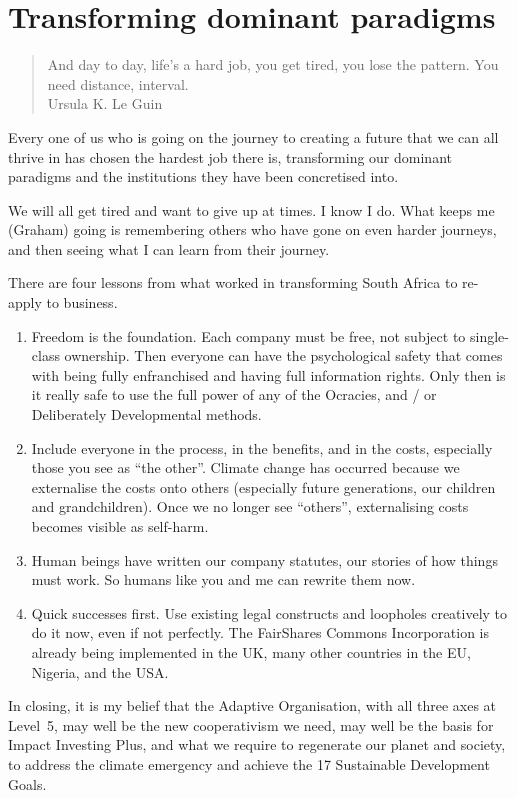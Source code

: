 \section{Transforming dominant paradigms}
\begin{quote}
And day to day, life's a hard job, you get tired, you lose the pattern. You need distance, interval.\\
\raggedleft\textemdash Ursula K. Le Guin
\end{quote}


Every one of us who is going on the journey to creating a future that we can all thrive in has chosen the hardest job there is, transforming our dominant paradigms and the institutions they have been concretised into. 


We will all get tired and want to give up at times. I know I do. What keeps me (Graham) going is remembering others who have gone on even harder journeys, and then seeing what I can learn from their journey. 


There are four lessons from what worked in transforming South Africa to re-apply to business.


\begin{enumerate}
\item Freedom is the foundation. Each company must be free, not subject to single-class ownership. Then everyone can have the psychological safety that comes with being fully enfranchised and having full information rights. Only then is it really safe to use the full power of any of the Ocracies\cite{robertson-holacracy, rau-sociocracy}, and / or Deliberately Developmental\cite{kegan-everyone} methods.
\item Include everyone in the process, in the benefits, and in the costs, especially those you see as “the other”. Climate change  has occurred because we externalise the costs onto others (especially future generations, our children and grandchildren). Once we no longer see “others”, externalising costs becomes visible as self-harm.
\item Human beings have written our company statutes, our stories of how things must work. So humans like you and me can rewrite them now.
\item Quick successes first. Use existing legal constructs and loopholes creatively to do it now, even if not perfectly. The FairShares Commons Incorporation is already being implemented in the UK, many other countries in the EU, Nigeria, and the USA.
\end{enumerate}




In closing, it is my belief that the Adaptive Organisation, with all three axes at Level~5, may well be the new cooperativism we need, may well be the basis for Impact Investing Plus, and what we require to regenerate our planet and society, to address the climate emergency and achieve the 17 Sustainable Development Goals. 